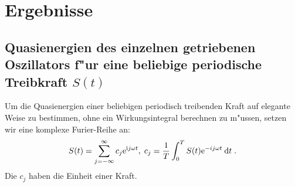 \chapter{Ergebnisse}


\section{Quasienergien des einzelnen getriebenen Oszillators f"ur eine beliebige periodische Treibkraft $S(t)$}
  Um die Quasienergien einer beliebigen periodisch treibenden Kraft auf elegante Weise zu bestimmen, ohne ein Wirkungsintegral berechnen zu m"ussen, setzen wir eine komplexe Furier-Reihe an:
  \begin{equation}
    S(t) = \sum_{j=-\infty}^\infty c_j \text e^{\text ij\omega t}, \; c_j = \frac{1}{T} \int_0^T S(t) \text e^{-ij\omega t} \: \text d t \; .
  \end{equation}
  Die $c_j$ haben die Einheit einer Kraft.

